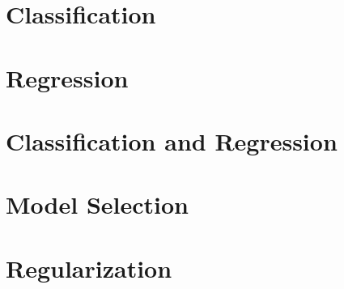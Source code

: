\section{Classification}


\section{Regression}


\section{Classification and Regression}


\section{Model Selection}


\section{Regularization}

